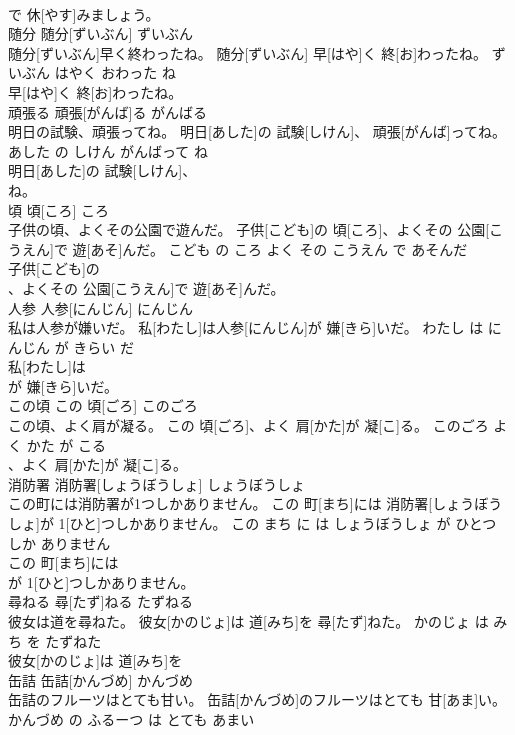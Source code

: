 \documentclass[8pt]{extreport}
\begin{document}
\begin{CJK}{UTF8}{min}
\\	で 休[やす]みましょう。		
\\	随分	随分[ずいぶん]	ずいぶん	
\\	随分[ずいぶん]早く終わったね。	随分[ずいぶん] 早[はや]く 終[お]わったね。	ずいぶん はやく おわった ね	
\\	早[はや]く 終[お]わったね。		
\\	頑張る	頑張[がんば]る	がんばる	
\\	明日の試験、頑張ってね。	明日[あした]の 試験[しけん]、 頑張[がんば]ってね。	あした の しけん がんばって ね	
\\	明日[あした]の 試験[しけん]、
\\	ね。		
\\	頃	頃[ころ]	ころ	
\\	子供の頃、よくその公園で遊んだ。	子供[こども]の 頃[ころ]、よくその 公園[こうえん]で 遊[あそ]んだ。	こども の ころ よく その こうえん で あそんだ	
\\	子供[こども]の
\\	、よくその 公園[こうえん]で 遊[あそ]んだ。		
\\	人参	人参[にんじん]	にんじん	
\\	私は人参が嫌いだ。	私[わたし]は人参[にんじん]が 嫌[きら]いだ。	わたし は にんじん が きらい だ	
\\	私[わたし]は
\\	が 嫌[きら]いだ。		
\\	この頃	この 頃[ごろ]	このごろ	
\\	この頃、よく肩が凝る。	この 頃[ごろ]、よく 肩[かた]が 凝[こ]る。	このごろ よく かた が こる	
\\	、よく 肩[かた]が 凝[こ]る。		
\\	消防署	消防署[しょうぼうしょ]	しょうぼうしょ	
\\	この町には消防署が1つしかありません。	この 町[まち]には 消防署[しょうぼうしょ]が 1[ひと]つしかありません。	この まち に は しょうぼうしょ が ひとつ しか ありません	
\\	この 町[まち]には
\\	が 1[ひと]つしかありません。		
\\	尋ねる	尋[たず]ねる	たずねる	
\\	彼女は道を尋ねた。	彼女[かのじょ]は 道[みち]を 尋[たず]ねた。	かのじょ は みち を たずねた	
\\	彼女[かのじょ]は 道[みち]を
\\	缶詰	缶詰[かんづめ]	かんづめ	
\\	缶詰のフルーツはとても甘い。	缶詰[かんづめ]のフルーツはとても 甘[あま]い。	かんづめ の ふるーつ は とても あまい	

\end{CJK}
\end{document}
